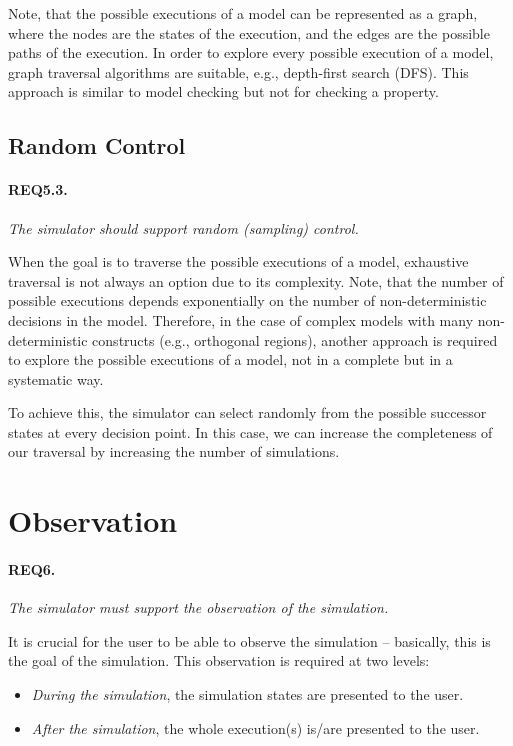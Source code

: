 Note, that the possible executions of a model can be represented as a graph, where the nodes are the states of the execution, and the edges are the possible paths of the execution. In order to explore every possible execution of a model, graph traversal algorithms are suitable, e.g., depth-first search (DFS). This approach is similar to model checking but not for checking a property.

\subsection{Random Control}

\paragraph{REQ5.3.} \textit{The simulator should support random (sampling) control.}

When the goal is to traverse the possible executions of a model, exhaustive traversal is not always an option due to its complexity. Note, that the number of possible executions depends exponentially on the number of non-deterministic decisions in the model. Therefore, in the case of complex models with many non-deterministic constructs (e.g., orthogonal regions), another approach is required to explore the possible executions of a model, not in a complete but in a systematic way.

To achieve this, the simulator can select randomly from the possible successor states at every decision point. In this case, we can increase the completeness of our traversal by increasing the number of simulations.

\section{Observation}\label{sec:req-observ}

\paragraph{REQ6.} \textit{The simulator must support the observation of the simulation.}

It is crucial for the user to be able to observe the simulation -- basically, this is the goal of the simulation.  This observation is required at two levels:
\begin{itemize}
    \item \textit{During the simulation}, the simulation states are presented to the user.
    \item \textit{After the simulation}, the whole execution(s) is/are presented to the user.
\end{itemize}

